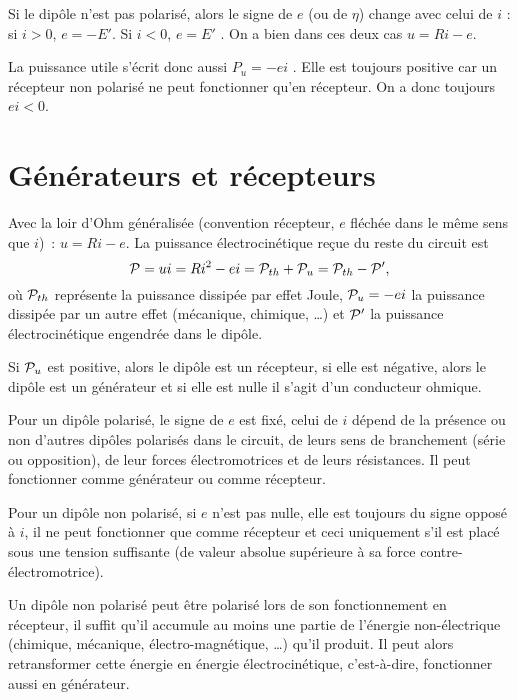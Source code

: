 Si le dipôle n'est pas polarisé, alors le signe de $e$ (ou de $\eta$) change avec celui de $i$ : si $i > 0$, $e = -E'$. Si $i < 0$, $e = E'$ . On a bien dans ces deux cas $u = R i - e$.

La puissance utile s'écrit donc aussi $P_u = - e i$ . Elle est toujours positive car un récepteur non polarisé ne peut fonctionner qu'en récepteur. On a donc toujours $ei < 0$.

\section{Générateurs et récepteurs}
Avec la loir d'Ohm généralisée (convention récepteur, $e$ fléchée dans le même sens que $i$)~: $u=Ri-e$. La puissance électrocinétique reçue du reste du circuit est
\begin{equation}
	\P = ui = Ri^2 - ei = \P_{th}+ \P_u = \P_{th} - \P',
\end{equation}
où $\P_{th}$ représente la puissance dissipée par effet Joule, $\P_u=-ei$ la puissance dissipée par un autre effet (mécanique, chimique, \ldots{}) et $\P'$ la puissance électrocinétique engendrée dans le dipôle.

Si $\P_u$ est positive, alors le dipôle est un récepteur, si elle est négative, alors le dipôle est un générateur et si elle est nulle il s'agit d'un conducteur ohmique.

Pour un dipôle polarisé, le signe de $e$ est fixé, celui de $i$ dépend de la présence ou non d'autres dipôles polarisés dans le circuit, de leurs sens de branchement (série ou opposition), de leur forces électromotrices et de leurs résistances. Il peut fonctionner comme générateur ou comme récepteur.

Pour un dipôle non polarisé, si $e$ n'est pas nulle, elle est toujours du signe opposé à $i$, il ne peut fonctionner que comme récepteur et ceci uniquement s'il est placé sous une tension suffisante (de valeur absolue supérieure à sa force contre-électromotrice).

Un dipôle non polarisé peut être polarisé lors de son fonctionnement en récepteur, il suffit qu'il accumule au moins une partie de l'énergie non-électrique (chimique, mécanique, électro-magnétique, \ldots{}) qu'il produit. Il peut alors retransformer cette énergie en énergie électrocinétique, c'est-à-dire, fonctionner aussi en générateur.

